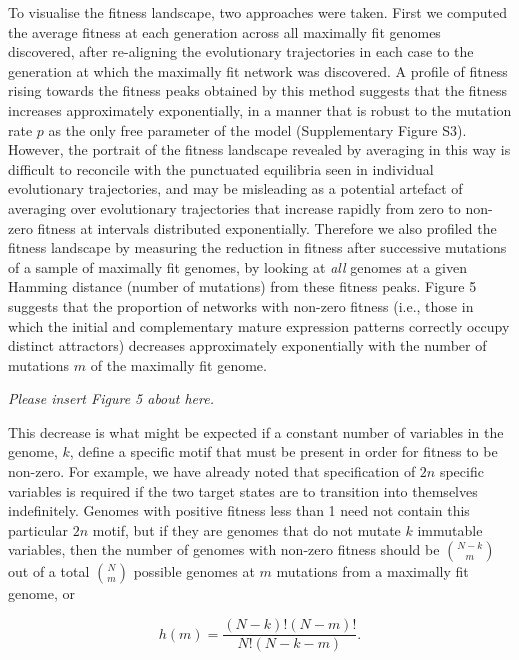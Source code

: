 \documentclass[10pt,letterpaper]{article}
\begin{document}
To visualise the fitness landscape, two approaches were taken. First we computed the average fitness at each generation across all maximally fit genomes discovered, after re-aligning the evolutionary trajectories in each case to the generation at which the maximally fit network was discovered. A profile of fitness rising towards the fitness peaks obtained by this method suggests that the fitness increases approximately exponentially, in a manner that is robust to the mutation rate $p$ as the only free parameter of the model (Supplementary Figure S3). However, the portrait of the fitness landscape revealed by averaging in this way is difficult to reconcile with the punctuated equilibria seen in individual evolutionary trajectories, and may be misleading as a potential artefact of averaging over evolutionary trajectories that increase rapidly from zero to non-zero fitness at intervals distributed exponentially. Therefore we also profiled the fitness landscape by measuring the reduction in fitness after successive mutations of a sample of maximally fit genomes, by looking at \emph{all} genomes at a given Hamming distance (number of mutations) from these fitness peaks. Figure 5 suggests that the proportion of networks with non-zero fitness (i.e., those in which the initial and complementary mature expression patterns correctly occupy distinct attractors) decreases approximately exponentially with the number of mutations $m$ of the maximally fit genome. 

\vspace{1em}\emph{\noindent Please insert Figure 5 about here.}\vspace{1em}

This decrease is what might be expected if a constant number of variables in the genome, $k$, define a specific motif that must be present in order for fitness to be non-zero. For example, we have already noted that specification of $2n$ specific variables is required if the two target states are to transition into themselves indefinitely. Genomes with positive fitness less than 1 need not contain this particular $2n$ motif, but if they are genomes that do not mutate $k$ immutable variables, then the number of genomes with non-zero fitness should be ${{N-k}\choose{m}}$ out of a total ${{N}\choose{m}}$ possible genomes at $m$ mutations from a maximally fit genome, or

\begin{equation}
h(m)=\frac{(N-k)! (N-m)!}{N!(N-k-m)}.
\end{equation}
\end{document}
